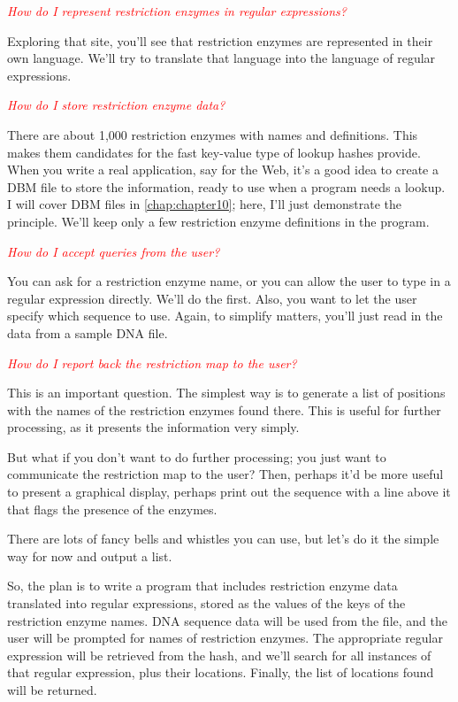 \textcolor{red}{\textit{How do I represent restriction enzymes in regular expressions?}}
\begin{adjustwidth}{1cm}{}
Exploring that site, you'll see that restriction enzymes are represented in their own language. We'll try to translate that language into the language of regular expressions.
\end{adjustwidth}

\textcolor{red}{\textit{How do I store restriction enzyme data?}}
\begin{adjustwidth}{1cm}{}
There are about 1,000 restriction enzymes with names and definitions.  This makes them candidates for the fast key-value type of lookup hashes provide. When you write a real application, say for the Web, it's a good idea to create a DBM file to store the information, ready to use when a program needs a lookup. I will cover DBM files in \autoref{chap:chapter10}; here, I'll just demonstrate the principle. We'll keep only a few restriction enzyme definitions in the program.
\end{adjustwidth}

\textcolor{red}{\textit{How do I accept queries from the user?}}
\begin{adjustwidth}{1cm}{}
You can ask for a restriction enzyme name, or you can allow the user to type in a regular expression directly. We'll do the first. Also, you want to let the user specify which sequence to use. Again, to simplify matters, you'll just read in the data from a sample DNA file. 
\end{adjustwidth}

\textcolor{red}{\textit{How do I report back the restriction map to the user?}}
\begin{adjustwidth}{1cm}{}
This is an important question. The simplest way is to generate a list of positions with the names of the restriction enzymes found there. This is useful for further processing, as it presents the information very simply.

But what if you don't want to do further processing; you just want to communicate the restriction map to the user? Then, perhaps it'd be more useful to present a graphical display, perhaps print out the sequence with a line above it that flags the presence of the enzymes.

There are lots of fancy bells and whistles you can use, but let's do it the simple way for now and output a list.
\end{adjustwidth}

So, the plan is to write a program that includes restriction enzyme data translated into regular expressions, stored as the values of the keys of the restriction enzyme names. DNA sequence data will be used from the file, and the user will be prompted for names of restriction enzymes.  The appropriate regular expression will be retrieved from the hash, and we'll search for all instances of that regular expression, plus their locations. Finally, the list of locations found will be returned. 

